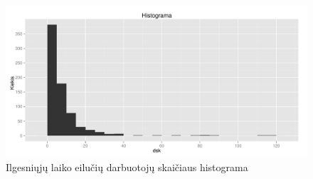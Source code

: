 \documentclass[a4paper]{article}
\begin{document}
\begin{figure}[here]
\includegraphics[width=\textwidth]{hist_dsk.pdf}
\caption{Ilgesniųjų laiko eilučių darbuotojų skaičiaus histograma}
\label{fig:histdsk}
\end{figure}
\end{document}
